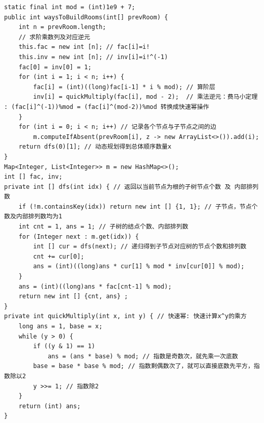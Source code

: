 \documentclass[9pt, b5paaper]{book}
\begin{document}
\begin{verbatim}
static final int mod = (int)1e9 + 7;
public int waysToBuildRooms(int[] prevRoom) {
    int n = prevRoom.length;
    // 求阶乘数列及对应逆元
    this.fac = new int [n]; // fac[i]=i!
    this.inv = new int [n]; // inv[i]=i!^(-1)
    fac[0] = inv[0] = 1;
    for (int i = 1; i < n; i++) {
        fac[i] = (int)((long)fac[i-1] * i % mod); // 算阶层
        inv[i] = quickMultiply(fac[i], mod - 2);  // 乘法逆元：费马小定理 : (fac[i]^(-1))%mod = (fac[i]^(mod-2))%mod 转换成快速幂操作
    }
    for (int i = 0; i < n; i++) // 记录各个节点与子节点之间的边
        m.computeIfAbsent(prevRoom[i], z -> new ArrayList<>()).add(i);
    return dfs(0)[1]; // 动态规划得到总体顺序数量x
}
Map<Integer, List<Integer>> m = new HashMap<>();
int [] fac, inv;  
private int [] dfs(int idx) { // 返回以当前节点为根的子树节点个数 及 内部排列数
    if (!m.containsKey(idx)) return new int [] {1, 1}; // 子节点，节点个数及内部排列数均为1
    int cnt = 1, ans = 1; // 子树的结点个数、内部排列数
    for (Integer next : m.get(idx)) {
        int [] cur = dfs(next); // 递归得到子节点对应树的节点个数和排列数
        cnt += cur[0];
        ans = (int)((long)ans * cur[1] % mod * inv[cur[0]] % mod);
    }
    ans = (int)((long)ans * fac[cnt-1] % mod);
    return new int [] {cnt, ans} ;
}
private int quickMultiply(int x, int y) { // 快速幂: 快速计算x^y的乘方
    long ans = 1, base = x;
    while (y > 0) {
        if ((y & 1) == 1)
            ans = (ans * base) % mod; // 指数是奇数次，就先乘一次底数
        base = base * base % mod; // 指数剩偶数次了，就可以直接底数先平方，指数除以2
        y >>= 1; // 指数除2
    }
    return (int) ans;
}
\end{verbatim}
\end{document}
